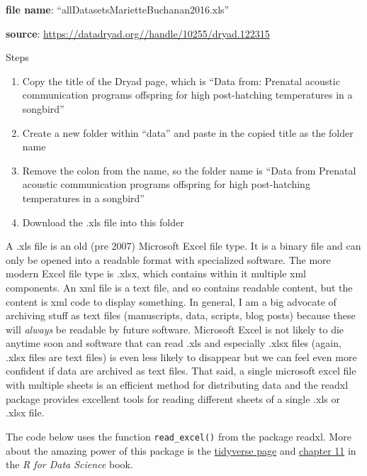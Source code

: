 \documentclass[]{book}
\providecommand{\tightlist}{%
  \setlength{\itemsep}{0pt}\setlength{\parskip}{0pt}}
\theoremstyle{definition}
\theoremstyle{definition}
\theoremstyle{definition}
\theoremstyle{remark}
\begin{document}
\textbf{file name}: ``allDatasetsMarietteBuchanan2016.xls''

\textbf{source}: \url{https://datadryad.org//handle/10255/dryad.122315}

Steps

\begin{enumerate}
\def\labelenumi{\arabic{enumi}.}
\tightlist
\item
  Copy the title of the Dryad page, which is ``Data from: Prenatal
  acoustic communication programs offspring for high post-hatching
  temperatures in a songbird''
\item
  Create a new folder within ``data'' and paste in the copied title as
  the folder name
\item
  Remove the colon from the name, so the folder name is ``Data from
  Prenatal acoustic communication programs offspring for high
  post-hatching temperatures in a songbird''
\item
  Download the .xls file into this folder
\end{enumerate}

A .xls file is an old (pre 2007) Microsoft Excel file type. It is a
binary file and can only be opened into a readable format with
specialized software. The more modern Excel file type is .xlsx, which
contains within it multiple xml components. An xml file is a text file,
and so contains readable content, but the content is xml code to display
something. In general, I am a big advocate of archiving stuff as text
files (manuscripts, data, scripts, blog posts) because these will
\emph{always} be readable by future software. Microsoft Excel is not
likely to die anytime soon and software that can read .xls and
especially .xlsx files (again, .xlsx files are text files) is even less
likely to disappear but we can feel even more confident if data are
archived as text files. That said, a single microsoft excel file with
multiple sheets is an efficient method for distributing data and the
readxl package provides excellent tools for reading different sheets of
a single .xls or .xlsx file.

The code below uses the function \texttt{read\_excel()} from the package
readxl. More about the amazing power of this package is the
\href{https://readxl.tidyverse.org}{tidyverse page} and
\href{http://r4ds.had.co.nz/data-import.html}{chapter 11} in the \emph{R
for Data Science} book.
\end{document}
